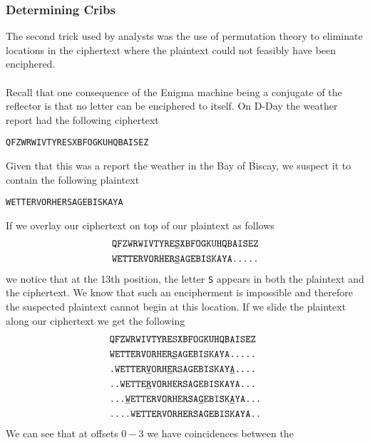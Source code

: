 \subsubsection{Determining Cribs}
The second trick used by analysts was the use of permutation theory to
eliminate locations in the ciphertext where the plaintext could not
feasibly have been enciphered.
\\\\Recall that one consequence of the Enigma machine being a
conjugate of the reflector is that no letter can be enciphered to
itself. On D-Day the weather report had the following ciphertext
\begin{center}
	\texttt{QFZWRWIVTYRESXBFOGKUHQBAISEZ}
\end{center}
Given that this was a report the weather in the Bay of Biscay, we
suspect it to contain the following plaintext
\begin{center}
	\texttt{WETTERVORHERSAGEBISKAYA}
\end{center}
If we overlay our ciphertext on top of our plaintext as follows
\begin{align*}
	 & \texttt{QFZWRWIVTYRE}{\uline{\texttt{S}}}\texttt{XBFOGKUHQBAISEZ} \\
	 & \texttt{WETTERVORHER}{\uline{\texttt{S}}}\texttt{AGEBISKAYA.....}
\end{align*}
we notice that at the 13th position, the letter \texttt{S} appears in
both the plaintext and the ciphertext. We know that such an
encipherment is impossible and therefore the suspected plaintext
cannot begin at this location. If we slide the plaintext along our
ciphertext we get the following
\begin{align*}
	 & \texttt{QFZWRWIVTYRESXBFOGKUHQBAISEZ}
	\\
	 & \texttt{WETTERVORHER}{\uline{\texttt{S}}}\texttt{AGEBISKAYA.....}
	\\
	 &
	\texttt{.WETTER}{\uline{\texttt{V}}}\texttt{ORH}{\uline{\texttt{E}}}\texttt{RSAGEBISKAY}{\uline{\texttt{A}}}\texttt{....}
	\\
	 & \texttt{..WETTE}{\uline{\texttt{R}}}\texttt{VORHERSAGEBISKAYA...}
	\\
	 &
	\texttt{...}{\uline{\texttt{W}}}\texttt{ETTERVORHERSA}{\uline{\texttt{G}}}\texttt{EBISK}{\uline{\texttt{A}}}\texttt{YA...}
	\\
	 & \texttt{....WETTERVORHERSAGEBISKAYA..}
	\\
\end{align*}
We can see that at offsets $0-3$ we have coincidences between the
